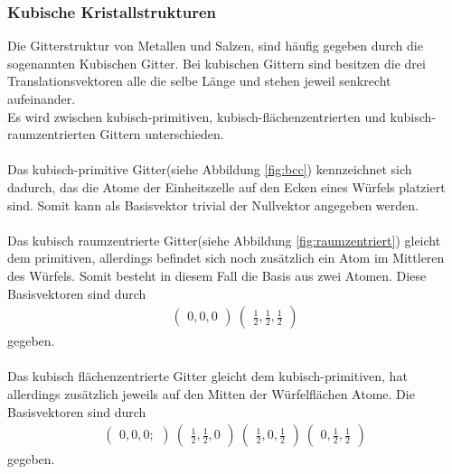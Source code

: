 \subsubsection{Kubische Kristallstrukturen}
\label{subsubsec:kubische_gitter}

Die Gitterstruktur von Metallen und Salzen, sind häufig gegeben
durch die sogenannten Kubischen Gitter.
Bei kubischen Gittern sind besitzen die drei Translationsvektoren
alle die selbe Länge und stehen jeweil senkrecht aufeinander.\\
Es wird zwischen kubisch-primitiven,
kubisch-flächenzentrierten und
kubisch-raumzentrierten Gittern unterschieden. \\ \\
Das kubisch-primitive Gitter(siehe Abbildung \ref{fig:bcc})
kennzeichnet sich dadurch,
das die Atome der Einheitszelle auf den Ecken
eines Würfels platziert sind. Somit kann als Basisvektor trivial
der Nullvektor angegeben werden.\\ \\
Das kubisch raumzentrierte Gitter(siehe Abbildung \ref{fig:raumzentriert})
gleicht dem primitiven, allerdings befindet sich noch
zusätzlich ein Atom im Mittleren des Würfels.
Somit besteht in diesem Fall die Basis aus zwei Atomen.
Diese Basisvektoren sind durch
\begin{align}
  \label{eqn:2}
  \begin{pmatrix}
    0, 0, 0
  \end{pmatrix}\
  \begin{pmatrix}
    \frac{1}{2}, \frac{1}{2}, \frac{1}{2}
  \end{pmatrix}
\end{align}
gegeben.\\ \\
Das kubisch flächenzentrierte Gitter gleicht dem kubisch-primitiven, hat
allerdings zusätzlich jeweils auf den Mitten der Würfelflächen Atome.
Die Basisvektoren sind durch
\begin{align}
   \label{eqn:3}
   \begin{pmatrix}
     0, 0, 0;
   \end{pmatrix}\
   \begin{pmatrix}
     \frac{1}{2}, \frac{1}{2}, 0
   \end{pmatrix}\
   \begin{pmatrix}
     \frac{1}{2}, 0, \frac{1}{2}
     \end{pmatrix}\
     \begin{pmatrix}
       0, \frac{1}{2}, \frac{1}{2}
     \end{pmatrix}
\end{align}
gegeben.

